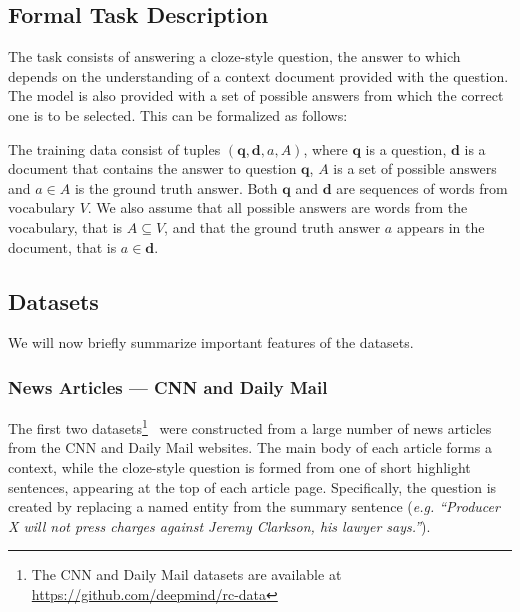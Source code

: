 \documentclass[11pt]{article}
\newcommand{\querySeq}{\mathbf{q}}
\newcommand{\documentSeq}{\mathbf{d}}
\newcommand{\answer}{a}
\begin{document}
\subsection{Formal Task Description}
The task consists of answering a cloze-style question, the answer to which depends on the understanding of a context document provided with the question. The model is also provided with a set of possible answers from which the correct one is to be selected. This can be formalized as follows:

The training data consist of tuples $( \querySeq, \documentSeq, \answer, A )$,
where $\querySeq$ is a question, $\documentSeq$ is a document that contains the answer to question $\querySeq$, $A$ is a set of possible answers and $a \in A$ is the ground truth answer. 
Both $\querySeq$ and $\documentSeq$ are sequences of words from vocabulary $V$. We also assume that all possible answers are words from the vocabulary, that is $A \subseteq V$, and that the ground truth answer $a$ appears in the document, that is $\answer \in \documentSeq$.

\subsection{Datasets}

We will now briefly summarize important features of the datasets.

\subsubsection{News Articles --- CNN and Daily Mail}
The first two datasets\footnote{The CNN and Daily Mail datasets are available at \url{https://github.com/deepmind/rc-data}}~\cite{hermann2015teaching} were constructed from a large number of news articles from the CNN and Daily Mail websites.
The main body of each article forms a context, while the cloze-style question is formed from one of short highlight sentences, appearing at the top of each article page.
Specifically, the question is created by replacing a named entity from the summary sentence (\emph{e.g. ``Producer X will not press charges against Jeremy Clarkson, his lawyer says.''}).
\end{document}
